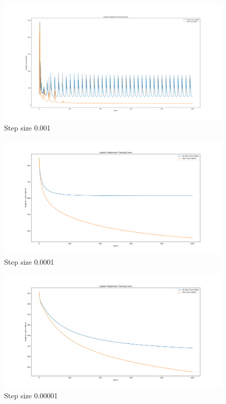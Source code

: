 \documentclass{article}
\begin{document}
        \begin{figure}[!h]
            \includegraphics[width=\textwidth]{"ssp001.png"}
            \caption{Step size 0.001}
        \end{figure}
        \begin{figure}[!h]
            \includegraphics[width=\textwidth]{"ssp0001.png"}
            \caption{Step size 0.0001}
        \end{figure}
        \begin{figure}[!h]
            \includegraphics[width=\textwidth]{"ssp00001.png"}
            \caption{Step size 0.00001}
        \end{figure}
\end{document}
